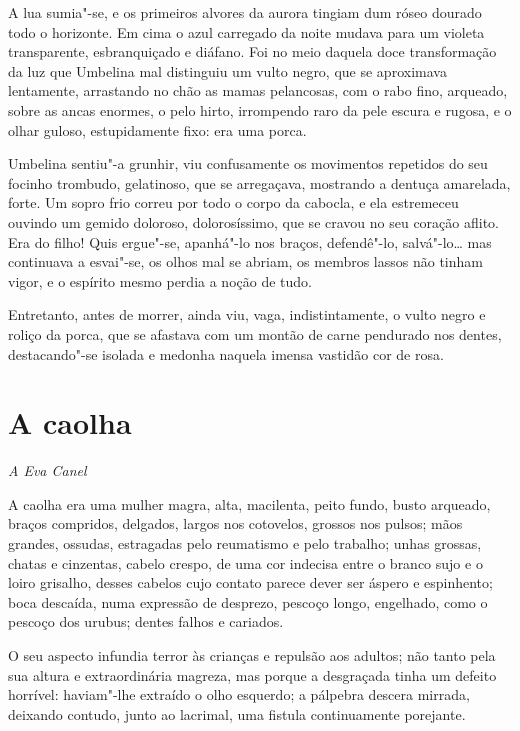 A lua sumia"-se, e os primeiros alvores da aurora tingiam dum róseo
dourado todo o horizonte. Em cima o azul carregado da noite mudava para
um violeta transparente, esbranquiçado e diáfano. Foi no meio daquela
doce transformação da luz que Umbelina mal distinguiu um vulto negro,
que se aproximava lentamente, arrastando no chão as mamas pelancosas,
com o rabo fino, arqueado, sobre as ancas enormes, o pelo hirto,
irrompendo raro da pele escura e rugosa, e o olhar guloso, estupidamente
fixo: era uma porca.

Umbelina sentiu"-a grunhir, viu confusamente os movimentos repetidos do
seu focinho trombudo, gelatinoso, que se arregaçava, mostrando a dentuça
amarelada, forte. Um sopro frio correu por todo o corpo da cabocla, e
ela estremeceu ouvindo um gemido doloroso, dolorosíssimo, que se cravou
no seu coração aflito. Era do filho! Quis ergue"-se, apanhá"-lo nos
braços, defendê"-lo, salvá"-lo\ldots{} mas continuava a esvai"-se, os olhos mal
se abriam, os membros lassos não tinham vigor, e o espírito mesmo perdia
a noção de tudo.

Entretanto, antes de morrer, ainda viu, vaga, indistintamente, o vulto
negro e roliço da porca, que se afastava com um montão de carne
pendurado nos dentes, destacando"-se isolada e medonha naquela imensa
vastidão cor de rosa.

\chapter{A caolha}

\hfill{}\emph{A Eva Canel}

\bigskip

A caolha era uma mulher magra, alta, macilenta, peito fundo, busto
arqueado, braços compridos, delgados, largos nos cotovelos, grossos nos
pulsos; mãos grandes, ossudas, estragadas pelo reumatismo e pelo
trabalho; unhas grossas, chatas e cinzentas, cabelo crespo, de uma cor
indecisa entre o branco sujo e o loiro grisalho, desses cabelos cujo
contato parece dever ser áspero e espinhento; boca descaída, numa
expressão de desprezo, pescoço longo, engelhado, como o pescoço dos
urubus; dentes falhos e cariados.

O seu aspecto infundia terror às crianças e repulsão aos adultos; não
tanto pela sua altura e extraordinária magreza, mas porque a desgraçada
tinha um defeito horrível: haviam"-lhe extraído o olho esquerdo; a
pálpebra descera mirrada, deixando contudo, junto ao lacrimal, uma
fistula continuamente porejante.

